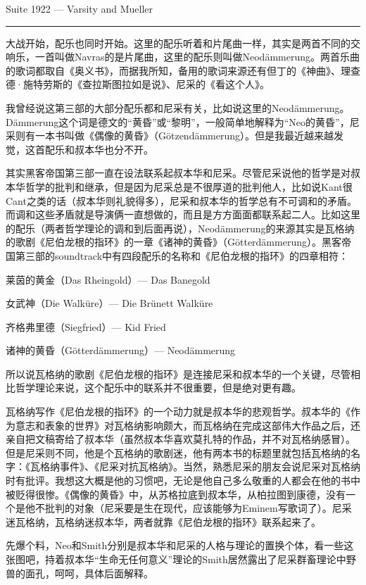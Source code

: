 \documentclass[UTF8]{ctexart}
\newcommand{\myparsep}{\noindent \rule[0.5ex]{\linewidth}{1pt}}
\begin{document}
Suite 1922 --- Varsity and Mueller

\myparsep

大战开始，配乐也同时开始。这里的配乐听着和片尾曲一样，其实是两首不同的交响乐，一首叫做Navras的是片尾曲，这里的配乐则叫做Neodämmerung。两首乐曲的歌词都取自《奥义书》，而据我所知，备用的歌词来源还有但丁的《神曲》、理查德·施特劳斯的《查拉斯图拉如是说》、尼采的《看这个人》。

我曾经说这第三部的大部分配乐都和尼采有关，比如说这里的Neodämmerung。Dämmerung这个词是德文的“黄昏”或“黎明”，一般简单地解释为“Neo的黄昏”，尼采则有一本书叫做《偶像的黄昏》（Götzendämmerung）。但是我最近越来越发觉，这首配乐和叔本华也分不开。

其实黑客帝国第三部一直在设法联系起叔本华和尼采。尽管尼采说他的哲学是对叔本华哲学的批判和继承，但是因为尼采总是不很厚道的批判他人，比如说Kant很Cant之类的话（叔本华则礼貌得多），尼采和叔本华的哲学总有不可调和的矛盾。而调和这些矛盾就是导演俩一直想做的，而且是方方面面都联系起二人。比如这里的配乐（两者哲学理论的调和到后面再说），Neodämmerung的来源其实是瓦格纳的歌剧《尼伯龙根的指环》的一章《诸神的黄昏》（Götterdämmerung‎）。黑客帝国第三部的soundtrack中有四段配乐的名称和《尼伯龙根的指环》的四章相符：

莱茵的黄金（Das Rheingold‎）--- Das Banegold

女武神（Die Walküre‎）--- Die Brünett Walküre

齐格弗里德（Siegfried‎）--- Kid Fried

诸神的黄昏（Götterdämmerung‎）--- Neodämmerung

所以说瓦格纳的歌剧《尼伯龙根的指环》是连接尼采和叔本华的一个关键，尽管相比哲学理论来说，这个配乐中的联系并不很重要，但是绝对更有趣。

瓦格纳写作《尼伯龙根的指环》的一个动力就是叔本华的悲观哲学。叔本华的《作为意志和表象的世界》对瓦格纳影响颇大，而瓦格纳在完成这部伟大作品之后，还亲自把文稿寄给了叔本华（虽然叔本华喜欢莫扎特的作品，并不对瓦格纳感冒）。但是尼采则不同，他是个瓦格纳的歌剧迷，他有两本书的标题里就包括瓦格纳的名字：《瓦格纳事件》、《尼采对抗瓦格纳》。当然，熟悉尼采的朋友会说尼采对瓦格纳时有批评。我想这大概是他的习惯吧，无论是他自己多么敬重的人都会在他的书中被贬得很惨。《偶像的黄昏》中，从苏格拉底到叔本华，从柏拉图到康德，没有一个是他不批判的对象（尼采要是生在现代，应该能够为Eminem写歌词了）。尼采迷瓦格纳，瓦格纳迷叔本华，两者就靠《尼伯龙根的指环》联系起来了。

先爆个料，Neo和Smith分别是叔本华和尼采的人格与理论的置换个体，看一些这张图吧，持着叔本华“生命无任何意义”理论的Smith居然露出了尼采群畜理论中野兽的面孔，呵呵，具体后面解释。
\end{document}

